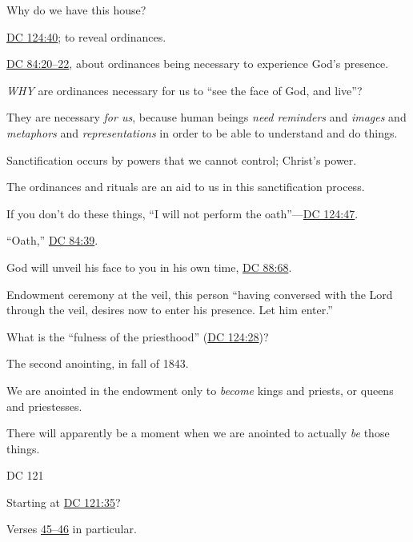 \begin{compactitem}
			\item Why do we have this house?
				\begin{compactitem}
					\item \hyperref[DC124-40]{DC 124:40}; to reveal ordinances.
					\item \hyperref[DC84-20]{DC 84:20--22}, about ordinances being necessary to experience God's presence.
					\item \textit{WHY} are ordinances necessary for us to ``see the face of God, and live''?
					\item They are necessary \textit{for us}, because human beings \textit{need reminders} and \textit{images} and \textit{metaphors} and \textit{representations} in order to be able to understand and do things.
					\item Sanctification occurs by powers that we cannot control; Christ's power.
					\item The ordinances and rituals are an aid to us in this sanctification process.
					\item 
					\item If you don't do these things, ``I will not perform the oath''---\hyperref[DC124-47]{DC 124:47}.
						\begin{compactitem}
							\item ``Oath,'' \hyperref[DC84-39]{DC 84:39}. 
							\item God will unveil his face to you in his own time, \hyperref[DC88-68]{DC 88:68}.
							\item Endowment ceremony at the veil, this person ``having conversed with the Lord through the veil, desires now to enter his presence. Let him enter.''
						\end{compactitem}
				\end{compactitem}
				
			\item What is the ``fulness of the priesthood'' (\hyperref[DC124-28]{DC 124:28})?
				\begin{compactitem}
					\item The second anointing, in fall of 1843.
					\item We are anointed in the endowment only to \textit{become} kings and priests, or queens and priestesses.
					\item There will apparently be a moment when we are anointed to actually \textit{be} those things.
				\end{compactitem}
				
			\item DC 121
				\begin{compactitem}
					\item Starting at \hyperref[DC121-35]{DC 121:35}?
					\item Verses \hyperref[DC121-45]{45--46} in particular.
				\end{compactitem}
		
		\end{compactitem}
	
